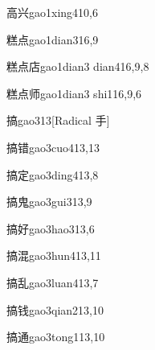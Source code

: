 \begin{entry}{高兴}{gao1xing4}{10,6}
\end{entry}

\begin{entry}{糕点}{gao1dian3}{16,9}
\end{entry}

\begin{entry}{糕点店}{gao1dian3 dian4}{16,9,8}
\end{entry}

\begin{entry}{糕点师}{gao1dian3 shi1}{16,9,6}
\end{entry}

\begin{entry}{搞}{gao3}{13}[Radical 手]
\end{entry}

\begin{entry}{搞错}{gao3cuo4}{13,13}
\end{entry}

\begin{entry}{搞定}{gao3ding4}{13,8}
\end{entry}

\begin{entry}{搞鬼}{gao3gui3}{13,9}
\end{entry}

\begin{entry}{搞好}{gao3hao3}{13,6}
\end{entry}

\begin{entry}{搞混}{gao3hun4}{13,11}
\end{entry}

\begin{entry}{搞乱}{gao3luan4}{13,7}
\end{entry}

\begin{entry}{搞钱}{gao3qian2}{13,10}
\end{entry}

\begin{entry}{搞通}{gao3tong1}{13,10}
\end{entry}

